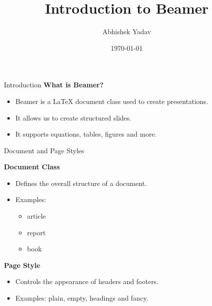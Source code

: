 \documentclass{beamer}
\title{Introduction to Beamer}
\author{Abhishek Yadav}
\institute{MNIT Jaipur}
\date{\today}
\begin{document}
\begin{frame}
    \titlepage
\end{frame}

\begin{frame}{Introduction}
    \textbf{What is Beamer?}

    \begin{itemize}
        \item Beamer is a LaTeX document class used to create presentations.
        \item It allows us to create structured slides.
        \item It supports equations, tables, figures and more.
    \end{itemize}
\end{frame}
\begin{frame}{Document and Page Styles}

    \textbf{Document Class}

    \begin{itemize}
        \item Defines the overall structure of a document.
        \item Examples:
        \begin{itemize}
            \item article
            \item report
            \item book
        \end{itemize}
    \end{itemize}

    \vspace{0.3cm}

    \textbf{Page Style}

    \begin{itemize}
        \item Controls the appearance of headers and footers.
        \item Examples: plain, empty, headings and fancy.
    \end{itemize}

\end{frame}
\end{document}
